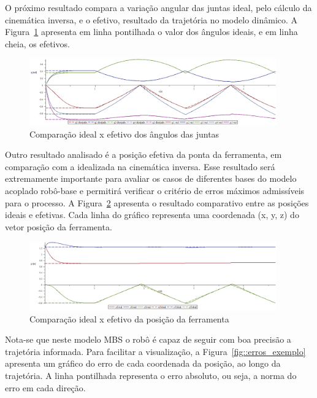 O próximo resultado compara a variação angular das juntas ideal, pelo cálculo da
cinemática inversa, e o efetivo, resultado da trajetória no modelo dinâmico.
A Figura~\ref{fig::qxt_ex_realxideal} apresenta em linha pontilhada o valor dos
ângulos ideais, e em linha cheia, os efetivos.

\begin{figure}[h]
	\centering 
 	\includegraphics[width=0.95\textwidth]{figs/qxt_ex_realxideal}
 	\caption{Comparação ideal x efetivo dos ângulos das juntas}
 	\label{fig::qxt_ex_realxideal}
\end{figure}

Outro resultado analisado é a posição efetiva da ponta da ferramenta, em
comparação com a idealizada na cinemática inversa. Esse resultado será
extremamente importante para avaliar os casos de diferentes bases do modelo
acoplado robô-base e permitirá verificar o critério de erros máximos admissíveis
para o processo. A Figura~\ref{fig::errop_exemplo} apresenta o resultado
comparativo entre as posições ideais e efetivas. Cada linha do gráfico
representa uma coordenada (x, y, z) do vetor posição da ferramenta.

\begin{figure}[h]
	\centering 
 	\includegraphics[width=0.95\textwidth]{figs/errop_exemplo}
 	\caption{Comparação ideal x efetivo da posição da ferramenta}
 	\label{fig::errop_exemplo}
\end{figure}

Nota-se que neste modelo MBS o robô é capaz de seguir com boa precisão a
trajetória informada. Para facilitar a visualização, a
Figura~\ref{fig::erros_exemplo} apresenta um gráfico do erro de cada coordenada
da posição, ao longo da trajetória. A linha pontilhada representa o erro
absoluto, ou seja, a norma do erro em cada direção.

